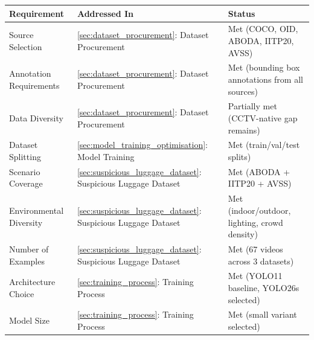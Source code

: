 \begin{table}[!htbp]
	\centering
	\small
	\begin{tabularx}{\textwidth}{@{\extracolsep{\fill}}>{\raggedright\arraybackslash}X >{\raggedright\arraybackslash}X >{\raggedright\arraybackslash}X}
		\toprule
		\textbf{Requirement}         & \textbf{Addressed In}                                                                            & \textbf{Status}                                            \\
		\midrule
		Source Selection             & \ref{sec:dataset_procurement}: Dataset Procurement                                               & Met (COCO, OID, ABODA, IITP20, AVSS)                       \\
		\addlinespace
		Annotation Requirements      & \ref{sec:dataset_procurement}: Dataset Procurement                                               & Met (bounding box annotations from all sources)            \\
		\addlinespace
		Data Diversity               & \ref{sec:dataset_procurement}: Dataset Procurement                                               & Partially met (CCTV-native gap remains)                    \\
		\addlinespace
		Dataset Splitting            & \ref{sec:model_training_optimisation}: Model Training                                            & Met (train/val/test splits)                                \\
		\addlinespace
		Scenario Coverage            & \ref{sec:suspicious_luggage_dataset}: Suspicious Luggage Dataset                                 & Met (ABODA + IITP20 + AVSS)                                \\
		\addlinespace
		Environmental Diversity      & \ref{sec:suspicious_luggage_dataset}: Suspicious Luggage Dataset                                 & Met (indoor/outdoor, lighting, crowd density)              \\
		\addlinespace
		Number of Examples           & \ref{sec:suspicious_luggage_dataset}: Suspicious Luggage Dataset                                 & Met (67 videos across 3 datasets)                          \\
		\addlinespace
		Architecture Choice          & \ref{sec:training_process}: Training Process                                                     & Met (YOLO11 baseline, YOLO26s selected)                    \\
		\addlinespace
		Model Size                   & \ref{sec:training_process}: Training Process                                                     & Met (small variant selected)                               \\

\end{tabularx}
\end{table}
